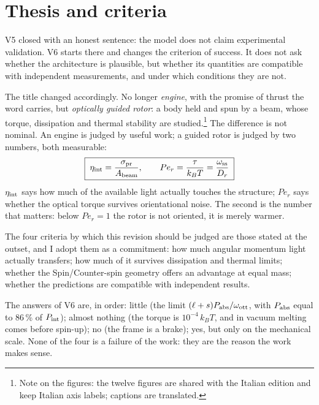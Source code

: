 \documentclass[11pt,a4paper]{article}
\begin{document}
\tableofcontents
\newpage

\section{Thesis and criteria}

V5 closed with an honest sentence: the model does not claim experimental validation.
V6 starts there and changes the criterion of success. It does not ask whether the
architecture is plausible, but whether its quantities are compatible with independent
measurements, and under which conditions they are not.

The title changed accordingly. No longer \emph{engine}, with the promise of thrust the
word carries, but \emph{optically guided rotor}: a body held and spun by a beam, whose
torque, dissipation and thermal stability are studied.\footnote{Note on the figures:
the twelve figures are shared with the Italian edition and keep Italian axis labels;
captions are translated.} The difference is not nominal.
An engine is judged by useful work; a guided rotor is judged by two numbers, both
measurable:
\begin{equation}
\boxed{\;\eta_{\rm int}=\frac{\sigma_{\rm pr}}{A_{\rm beam}},
\qquad
Pe_r=\frac{\tau}{k_BT}=\frac{\omega_{\rm ss}}{D_r}\;}
\label{eq:merito}
\end{equation}
$\eta_{\rm int}$ says how much of the available light actually touches the structure;
$Pe_r$ says whether the optical torque survives orientational noise. The second is the
number that matters: below $Pe_r=1$ the rotor is not oriented, it is merely warmer.

The four criteria by which this revision should be judged are those stated at the
outset, and I adopt them as a commitment: how much angular momentum light actually
transfers; how much of it survives dissipation and thermal limits; whether the
Spin/Counter-spin geometry offers an advantage at equal mass; whether the predictions
are compatible with independent results.

The answers of V6 are, in order: little (the limit
$(\ell+s)P_{\rm abs}/\omega_{\rm ott}$, with $P_{\rm abs}$ equal to 86\,\% of
$P_{\rm int}$); almost nothing (the torque is $10^{-4}\,k_BT$, and in vacuum melting
comes before spin-up); no (the frame is a brake); yes, but only on the mechanical
scale. None of the four is a failure of the work: they are the reason the work makes
sense.
\end{document}
